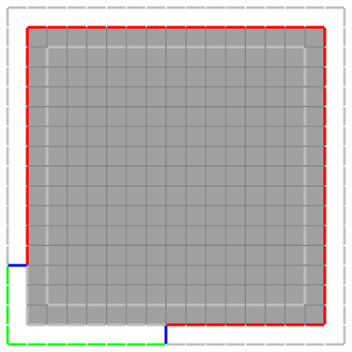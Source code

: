 \begin{figure}[h!]
{\includegraphics[scale=0.4]{figures/chapter5/gcurves/main-outer.pdf}
}\hspace{1em}\\[1em]
\end{figure}
